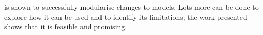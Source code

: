 
\Aop{} is shown to successfully modularise changes to models. Lots more can be
done to explore how it can be used and to identify its limitations; the work
presented shows that it is feasible and promising.





